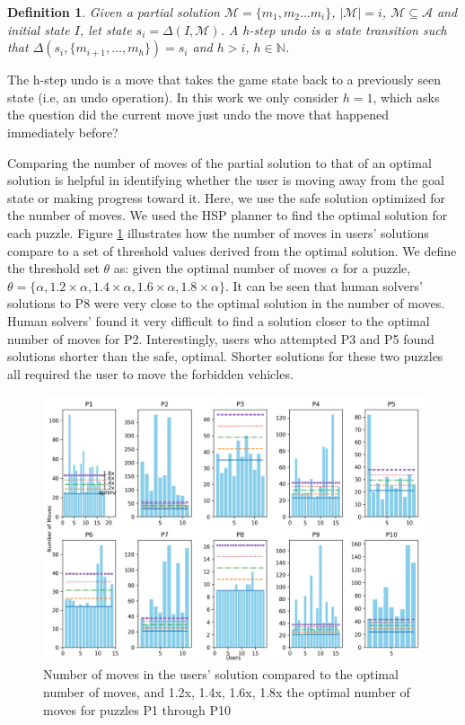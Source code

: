 \documentclass[doctor]{thesis} %
\theoremstyle{plain}
\newtheorem{definition}{Definition}
\begin{document}
\begin{definition}
Given a partial solution $\mathcal{M}=\lbrace m_1, m_2...m_i \rbrace$, $|\mathcal{M}|=i$, $\mathcal{M}\subseteq \mathcal{A}$ and initial state $I$, let state $s_i=\Delta(I,\mathcal{M})$. A h-step undo is a state transition such that $\Delta(s_i, \lbrace m_{i+1}, \ldots, m_h\rbrace)=s_i$ and $h>i$, $h \in \mathbb{N}$.
\end{definition}

The h-step undo is a move that takes the game state back to a previously seen state (i.e, an undo operation). In this work we only consider $h=1$, which asks the question did the current move just undo the move that happened immediately before?

Comparing the number of moves of the partial solution to that of an optimal solution is helpful in identifying whether the user is moving away from the goal state or making progress toward it. Here, we use the safe solution optimized for the number of moves. We used the HSP planner to find the optimal solution for each puzzle. Figure \ref{fig:difficuly} illustrates how the number of moves in users' solutions compare to a set of threshold values derived from the optimal solution. We define the threshold set $\theta$ as: given the optimal number of moves  $\alpha$ for a puzzle, $\theta=\lbrace \alpha, 1.2\times \alpha, 1.4\times \alpha, 1.6\times \alpha, 1.8\times \alpha\rbrace$. It can be seen that human solvers' solutions to P8 were very close to the optimal solution in the number of moves. Human solvers' found it very difficult to find a solution closer to the optimal number of moves for P2. Interestingly, users who attempted P3 and P5 found solutions shorter than the safe, optimal. Shorter solutions for these two puzzles all required the user to move the forbidden vehicles.

\begin{figure}[hbt]
  \centering
\includegraphics[width=\columnwidth]{img/difficulty.png}
  \caption{Number of moves in the users' solution compared to the optimal number of moves, and 1.2x, 1.4x, 1.6x, 1.8x the optimal number of moves for puzzles P1 through P10}
  \label{fig:difficuly}
\end{figure}
\end{document}
